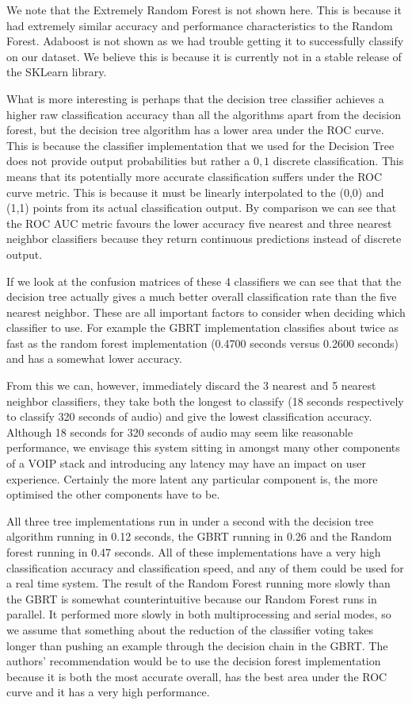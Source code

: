 \documentclass[ %
                    author={Sam Phippen},
                supervisor={Dr. Rafal Bogacz},
                     title={Real time voice activity detectors in noisy personal computing environments},
                  subtitle={},
                    degree={MEng},
                      year={2012} ]{thesis}
\begin{document}
We note that the Extremely Random Forest is not shown here. This is because it
had  extremely similar accuracy and performance characteristics to the Random
Forest. Adaboost is not shown as we had trouble getting it to successfully
classify on our dataset. We believe this is because it is currently not in a
stable release of the SKLearn library.

What is more interesting is perhaps that the decision tree classifier achieves
a higher raw classification accuracy than all the algorithms apart from the
decision forest, but the decision tree algorithm has a lower area under the ROC
curve. This is because the classifier implementation that we used for the
Decision Tree does not provide output probabilities but rather a ${0,1}$
discrete classification. This means that its potentially more accurate
classification suffers under the ROC curve metric. This is because it must be
linearly interpolated to the (0,0) and (1,1) points from its actual
classification output. By comparison we can see that the ROC AUC metric favours
the lower accuracy five nearest and three nearest neighbor classifiers because
they return continuous predictions instead of discrete output.

If we look at the confusion matrices of these 4 classifiers we can see
that that the decision tree actually gives a much better overall classification
rate than the five nearest neighbor. These are all important factors to
consider when deciding which classifier to use. For example the GBRT
implementation classifies about twice as fast as the random forest
implementation (0.4700 seconds versus 0.2600 seconds) and has a somewhat lower
accuracy.

From this we can, however, immediately discard the 3 nearest and 5 nearest
neighbor classifiers, they take both the longest to classify (18 seconds
respectively to classify 320 seconds of audio) and give the lowest
classification accuracy. Although 18 seconds for 320 seconds of audio may seem
like reasonable performance, we envisage this system sitting in amongst many
other components of a VOIP stack and introducing any latency may have an impact
on user experience. Certainly the more latent any particular component is, the
more optimised the other components have to be.

All three tree implementations run in under a second with the decision tree
algorithm running in 0.12 seconds, the GBRT running in 0.26 and the Random
forest running in 0.47 seconds. All of these implementations have a very high
classification accuracy and classification speed, and any of them could be used
for a real time system. The result of the Random Forest running more slowly
than the GBRT is somewhat counterintuitive because our Random Forest runs in
parallel. It performed more slowly in both multiprocessing and serial
modes, so we assume that something about the reduction of the classifier voting
takes longer than pushing an example through the decision chain in the GBRT.
The authors' recommendation would be to use the decision forest implementation
because it is both the most accurate overall, has the best area under the ROC
curve and it has a very high performance.
\end{document}
